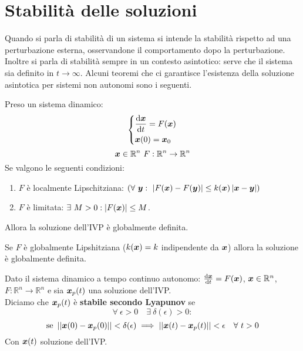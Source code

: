 \section{Stabilità delle soluzioni}%
\label{sub:Stabilità delle soluzioni}
Quando si parla di stabilità di un sistema si intende la stabilità rispetto ad una perturbazione esterna, osservandone il comportamento dopo la perturbazione.\\
Inoltre si parla di stabilità sempre in un contesto asintotico: serve che il sistema sia definito in $t\to \infty$. Alcuni teoremi che ci garantisce l'esistenza della soluzione asintotica per sistemi non autonomi sono i seguenti.
\begin{thm}
    Preso un sistema dinamico:
    \[\begin{dcases}
        \frac{\text{d} \boldsymbol{x}}{\text{d} t} = F(\boldsymbol{x}) \\
	\boldsymbol{x} (0)=\boldsymbol{x}_0
    \end{dcases}\] 
    \[
	\boldsymbol{x}\in \mathbb{R}^n \ F: \mathbb{R}^n \to \mathbb{R}^n  
    \] 
    Se valgono le seguenti condizioni:
    \begin{enumerate}
        \item $F$ è localmente Lipschitziana: $(\forall \ \vect{y}: \ \left|F(\vect{x})- F(\vect{y})\right|\le k(\vect{x})\left|\vect{x}-\vect{y}\right|)$
	\item $F$ è limitata: $\exists \ M >0 : \left|F(\boldsymbol{x})\right|\le M$.
    \end{enumerate}
    Allora la soluzione dell'IVP è globalmente definita.
\end{thm}
\noindent
\begin{thm}
    Se $F$ è globalmente Lipshitziana ($k(\boldsymbol{x})=k$ indipendente da $\boldsymbol{x}$) allora la soluzione è globalmente definita.
\end{thm}
\noindent
\begin{defn}
    Dato il sistema dinamico a tempo continuo autonomo: $\frac{\text{d} \boldsymbol{x}}{\text{d} t} = F(\boldsymbol{x})$, $\boldsymbol{x}\in \mathbb{R}^n$, $F: \mathbb{R}^n\to \mathbb{R}^n$ e sia $\boldsymbol{x}_p(t)$ una soluzione dell'IVP.\\
    Diciamo che $\boldsymbol{x}_p(t)$ è \textbf{stabile secondo Lyapunov} se
    \[
    \forall \ \epsilon  > 0 \quad \exists \ \delta (\epsilon)>0:
    \] 
    \[
	\text{se } \left|\left|\boldsymbol{x}(0)-\boldsymbol{x}_p(0)\right|\right|< \delta (\epsilon) \implies  
	\left|\left|\boldsymbol{x} (t)-\boldsymbol{x}_p(t)\right|\right|<\epsilon  \quad \forall \ t >0
    \] 
    Con $\boldsymbol{x} (t)$ soluzione dell'IVP.
\end{defn}
